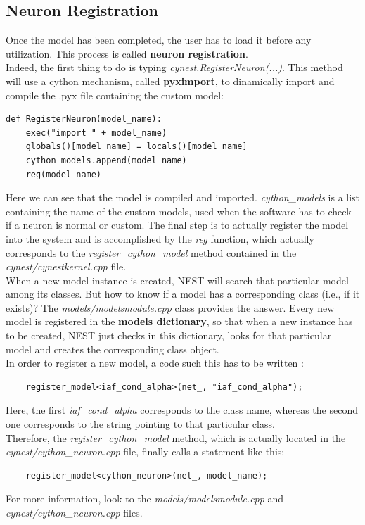 \documentclass{article}
\begin{document}
\subsection{Neuron Registration}
Once the model has been completed, the user has to load it before any utilization. This process is called \textbf{neuron registration}.\\
Indeed, the first thing to do is typing \emph{cynest.RegisterNeuron(...)}. This method will use a cython mechanism, called \textbf{pyximport}, to dinamically import and compile the .pyx file containing the custom model:
\begin{verbatim}
def RegisterNeuron(model_name):
    exec("import " + model_name)
    globals()[model_name] = locals()[model_name]
    cython_models.append(model_name)
    reg(model_name)
\end{verbatim}
Here we can see that the model is compiled and imported. \emph{cython\_models} is a list containing the name of the custom models, used when the software has to check if a neuron is normal or custom. The final step is to actually register the model into the system and is accomplished by the \emph{reg} function, which actually corresponds to the \emph{register\_cython\_model} method contained in the \emph{cynest/cynestkernel.cpp} file.\\

When a new model instance is created, NEST will search that particular model among its classes. But how to know if a model has a corresponding class (i.e., if it exists)? The \emph{models/modelsmodule.cpp} class provides the answer. Every new model is registered in the \textbf{models dictionary}, so that when a new instance has to be created, NEST just checks in this dictionary, looks for that particular model and creates the corresponding class object.\\
In order to register a new model, a code such this has to be written :
\begin{verbatim}
	register_model<iaf_cond_alpha>(net_, "iaf_cond_alpha");
\end{verbatim}
Here, the first \emph{iaf\_cond\_alpha} corresponds to the class name, whereas the second one corresponds to the string pointing to that particular class.\\
Therefore, the \emph{register\_cython\_model} method, which is actually located in the \emph{cynest/cython\_neuron.cpp} file, finally calls a statement like this:
\begin{verbatim}
	register_model<cython_neuron>(net_, model_name);
\end{verbatim}
For more information, look to the \emph{models/modelsmodule.cpp} and \emph{cynest/cython\_neuron.cpp} files.
\end{document}
